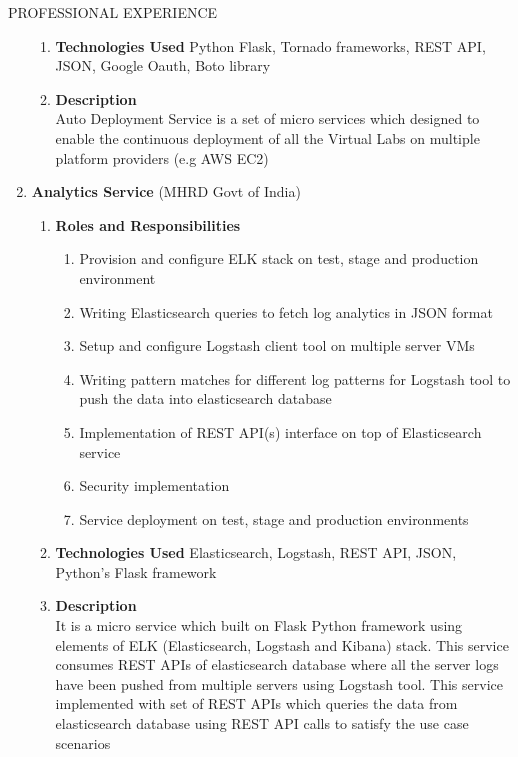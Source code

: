 \documentclass{resume} %
\newcommand{\blank}[1]{\hspace*{#1}}
\begin{document}
\begin{rSection}{PROFESSIONAL EXPERIENCE}
\begin{rSubsection}
\begin{enumerate}[label=\bfseries\arabic*]
\begin{enumerate}
  \item \textbf{Technologies Used } Python Flask, Tornado frameworks, REST
    API, JSON, Google Oauth, Boto library
  \item \textbf{Description } \\
    \blank{2 cm}Auto Deployment Service is a set of micro services which designed to enable
    the continuous deployment of all the Virtual Labs on multiple platform
    providers (e.g AWS EC2)
  \end{enumerate}

\item \textbf{Analytics Service} (MHRD Govt of India)
  \begin{enumerate}
  \item \textbf{Roles and Responsibilities }
    \begin{enumerate}
    \item Provision and configure ELK stack on test, stage and
      production environment
    \item Writing Elasticsearch queries to fetch log analytics in JSON
      format
    \item Setup and configure Logstash client tool on multiple server
      VMs
    \item Writing pattern matches for different log patterns for
      Logstash tool to push the data into elasticsearch database
    \item Implementation of REST API(s) interface on top of
      Elasticsearch service
    \item Security implementation
    \item Service deployment on test, stage and production environments
    \end{enumerate}
  \item \textbf{Technologies Used } Elasticsearch, Logstash, REST API,
    JSON, Python's Flask framework
  \item \textbf{Description } \\
    \blank{2 cm} It is a micro service which built on Flask Python framework using elements of ELK
    (Elasticsearch, Logstash and Kibana) stack. This service consumes REST
    APIs of elasticsearch database where all the server logs have been
    pushed from multiple servers using Logstash tool. This service
    implemented with set of REST APIs which queries the data from
    elasticsearch database using REST API calls to satisfy the use case
    scenarios
  \end{enumerate}


\end{enumerate}
\end{rSubsection}
\end{rSection}
\end{document}
